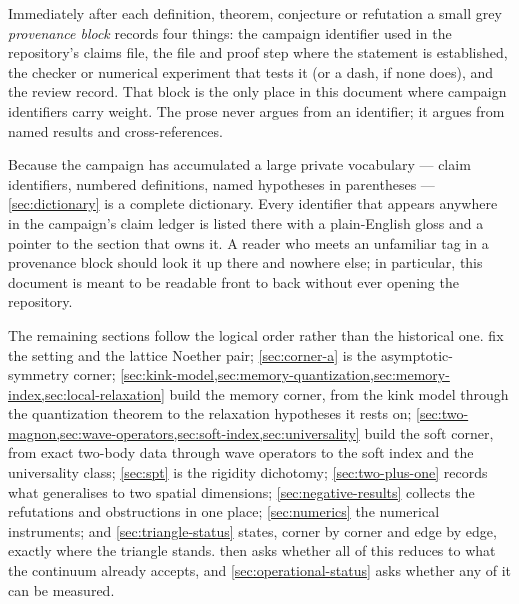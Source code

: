Immediately after each definition, theorem, conjecture or refutation a small
grey \emph{provenance block} records four things: the campaign identifier
used in the repository's claims file, the file and proof step where the
statement is established, the checker or numerical experiment that tests it
(or a dash, if none does), and the review record. That block is the only
place in this document where campaign identifiers carry weight. The prose
never argues from an identifier; it argues from named results and
cross-references.

Because the campaign has accumulated a large private vocabulary ---
claim identifiers, numbered definitions, named hypotheses in parentheses ---
\cref{sec:dictionary} is a complete dictionary. Every identifier that appears
anywhere in the campaign's claim ledger is listed there with a plain-English
gloss and a pointer to the section that owns it. A reader who meets an
unfamiliar tag in a provenance block should look it up there and nowhere
else; in particular, this document is meant to be readable front to back
without ever opening the repository.

The remaining sections follow the logical order rather than the historical
one.  fix the setting and the
lattice Noether pair; \cref{sec:corner-a} is the asymptotic-symmetry corner;
\cref{sec:kink-model,sec:memory-quantization,sec:memory-index,sec:local-relaxation}
build the memory corner, from the kink model through the quantization theorem
to the relaxation hypotheses it rests on;
\cref{sec:two-magnon,sec:wave-operators,sec:soft-index,sec:universality} build
the soft corner, from exact two-body data through wave operators to the soft
index and the universality class; \cref{sec:spt} is the rigidity dichotomy;
\cref{sec:two-plus-one} records what generalises to two spatial dimensions;
\cref{sec:negative-results} collects the refutations and obstructions in one
place; \cref{sec:numerics} the numerical instruments; and
\cref{sec:triangle-status} states, corner by corner and edge by edge, exactly
where the triangle stands.  then asks whether all
of this reduces to what the continuum already accepts, and
\cref{sec:operational-status} asks whether any of it can be measured.

